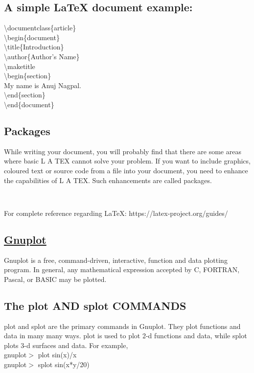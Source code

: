 \documentclass[a4paper, 12pt]{article}
\begin{document}
\newpage

\subsection{A simple \LaTeX{} document example:}
\textbackslash documentclass\{article\} \\
\textbackslash begin\{document\}\\
\textbackslash title\{Introduction\}\\
\textbackslash author\{Author's Name\}\\
\textbackslash maketitle \\
\textbackslash begin\{section\} \\
My name is Anuj Nagpal. \\
\textbackslash end\{section\} \\
\textbackslash end\{document\}

\subsection{Packages}
While writing your document, you will probably find that there are some
areas where basic L A TEX cannot solve your problem. If you want to include
graphics, coloured text or source code from a file into your document, you
need to enhance the capabilities of L A TEX. Such enhancements are called
packages.

\

For complete reference regarding \LaTeX{}:
https://latex-project.org/guides/
		
\begin{center}
\section{\underline{Gnuplot}}
\end{center}	

Gnuplot is a free, command-driven, interactive, function and data plotting program. In general, any mathematical expression accepted by C, FORTRAN, Pascal, or BASIC may be plotted. \\

\subsection{The plot AND splot COMMANDS}
plot and splot are the primary commands in Gnuplot. They plot functions and data in many many ways. plot is used to plot 2-d functions and data, while splot plots 3-d surfaces and data. For example, \\
	gnuplot$>$  plot sin(x)/x  \\
    gnuplot$>$  splot sin(x*y/20)\\
\end{document}
